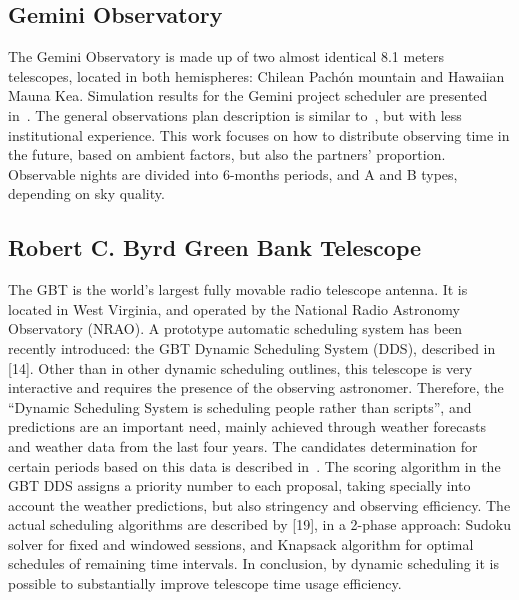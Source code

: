 \subsection{Gemini Observatory}
The Gemini Observatory is made up of two almost identical 8.1 meters telescopes, located in both hemispheres: Chilean Pach\'on mountain and Hawaiian Mauna Kea. Simulation results for the Gemini project scheduler are presented in~\cite{puxley97}. The general observations plan description is similar to~\cite{silva02}, but with less institutional experience. This work focuses on how to distribute observing time in the future, based on ambient factors, but also the partners' proportion. Observable nights are divided into 6-months periods, and A and B types, depending on sky quality.

\subsection{Robert C. Byrd Green Bank Telescope}
The GBT is the world's largest fully movable radio telescope antenna. It is located in West Virginia, and operated by the National Radio Astronomy Observatory (NRAO). A prototype automatic scheduling system has been recently introduced: the GBT Dynamic Scheduling System (DDS), described in [14]. Other than in other dynamic scheduling outlines, this telescope is very interactive and requires the presence of the observing astronomer. Therefore, the ``Dynamic Scheduling System is scheduling people rather than scripts'', and predictions are an important need, mainly achieved through weather forecasts and weather data from the last four years. The candidates determination for certain periods based on this data is described in~\cite{balser09}. The scoring algorithm in the GBT DDS assigns a priority number to each proposal, taking specially into account the weather predictions, but also stringency and observing efficiency. The actual scheduling algorithms are described by [19], in a 2-phase approach: Sudoku solver for fixed and windowed sessions, and Knapsack algorithm for optimal schedules of remaining time intervals. In conclusion, by dynamic scheduling it is possible to substantially improve telescope time usage efficiency.

